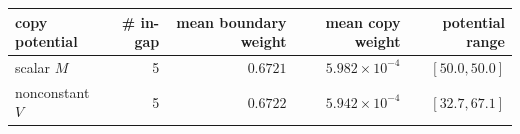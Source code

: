 \begin{tabular}{@{}lrrrr@{}}
\toprule
copy potential & \# in-gap & mean boundary weight & mean copy weight & potential range \\
\midrule
scalar $M$ & 5 & $0.6721$ & $5.982\times 10^{-4}$ & $[50.0,50.0]$ \\
nonconstant $V$ & 5 & $0.6722$ & $5.942\times 10^{-4}$ & $[32.7,67.1]$ \\
\bottomrule
\end{tabular}
